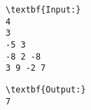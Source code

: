 \begin{verbatim}
\textbf{Input:}
4
3
-5 3
-8 2 -8
3 9 -2 7 \end{verbatim}
\begin{verbatim}
\textbf{Output:}
7\end{verbatim}